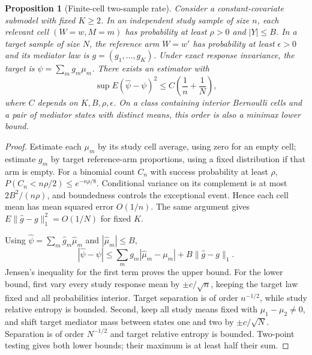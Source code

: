 \documentclass[11pt]{article}
\newtheorem{proposition}[theorem]{Proposition}
\theoremstyle{remark}
\begin{document}
\begin{proposition}[Finite-cell two-sample rate]
Consider a constant-covariate submodel with fixed $K\ge2$. In an independent study sample of size $n$, each relevant cell $(W=w,M=m)$ has probability at least $\rho>0$ and $|Y|\le B$. In a target sample of size $N$, the reference arm $W=w'$ has probability at least $\epsilon>0$ and its mediator law is $g=(g_1,\ldots,g_K)$. Under exact response invariance, the target is $\psi=\sum_mg_m\mu_m$. There exists an estimator with
\[
 \sup E(\widehat\psi-\psi)^2\le C\left(\frac1n+\frac1N\right),
\]
where $C$ depends on $K,B,\rho,\epsilon$. On a class containing interior Bernoulli cells and a pair of mediator states with distinct means, this order is also a minimax lower bound.
\end{proposition}
\begin{proof}
Estimate each $\mu_m$ by its study cell average, using zero for an empty cell; estimate $g_m$ by target reference-arm proportions, using a fixed distribution if that arm is empty. For a binomial count $C_n$ with success probability at least $\rho$,
$P(C_n<n\rho/2)\le e^{-n\rho/8}$.
Conditional variance on its complement is at most $2B^2/(n\rho)$, and boundedness controls the exceptional event. Hence each cell mean has mean squared error $O(1/n)$. The same argument gives $E\|\widehat g-g\|_1^2=O(1/N)$ for fixed $K$.

Using $\widehat\psi=\sum_m\widehat g_m\widehat\mu_m$ and $|\widehat\mu_m|\le B$,
\[
 |\widehat\psi-\psi|\le\sum_mg_m|\widehat\mu_m-\mu_m|+
 B\|\widehat g-g\|_1.
\]
Jensen's inequality for the first term proves the upper bound. For the lower bound, first vary every study response mean by $\pm c/\sqrt n$, keeping the target law fixed and all probabilities interior. Target separation is of order $n^{-1/2}$, while study relative entropy is bounded. Second, keep all study means fixed with $\mu_1-\mu_2\ne0$, and shift target mediator mass between states one and two by $\pm c/\sqrt N$. Separation is of order $N^{-1/2}$ and target relative entropy is bounded. Two-point testing gives both lower bounds; their maximum is at least half their sum.
\end{proof}
\end{document}
